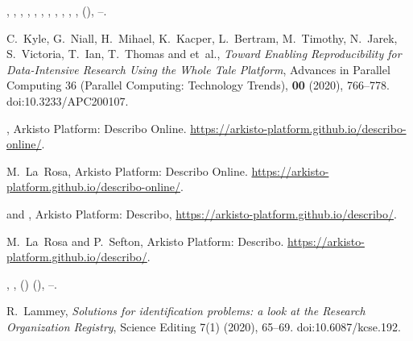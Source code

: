 \documentclass[ds,v1.1.2,openaccess]{iosart2x}%
\begin{document}
\begin{thebibliography}{}
%
\begin{barticle}
,
,
,
,
,
,
,
,
,
 \betal,
,
(),
--.
\end{barticle}
%
\OrigBibText
C.~Kyle,
G.~Niall,
H.~Mihael,
K.~Kacper,
L.~Bertram,
M.~Timothy,
N.~Jarek,
S.~Victoria,
T.~Ian,
T.~Thomas and
et~al.,
\textit{Toward Enabling Reproducibility for Data-Intensive Research
Using the
Whole Tale Platform},
Advances in Parallel Computing
36 (Parallel Computing: Technology Trends), \textbf{00}
(2020),
766--778.
doi:10.3233/APC200107.
\endOrigBibText
{}
\endbibitem

%
\begin{botherref}
,
Arkisto Platform: Describo Online.
\url{https://arkisto-platform.github.io/describo-online/}.
\end{botherref}
%
\OrigBibText
M.~La~Rosa,
Arkisto Platform: Describo Online.
\url{https://arkisto-platform.github.io/describo-online/}.
\endOrigBibText
{}
\endbibitem

%
\begin{botherref}
 and
,
Arkisto Platform: Describo, \url{https://arkisto-platform.github.io/describo/}.
\end{botherref}
%
\OrigBibText
M.~La~Rosa and
P.~Sefton,
Arkisto Platform: Describo.
\url{https://arkisto-platform.github.io/describo/}.
\endOrigBibText
{}
\endbibitem

%
\begin{barticle}
,
,
()
(),
--.
\end{barticle}
%
\OrigBibText
R.~Lammey,
\textit{Solutions for identification problems: a look at the Research
Organization Registry},
Science Editing
7(1)
(2020),
65--69.
doi:10.6087/kcse.192.
\endOrigBibText
{}
\endbibitem


\end{thebibliography}
\end{document}
